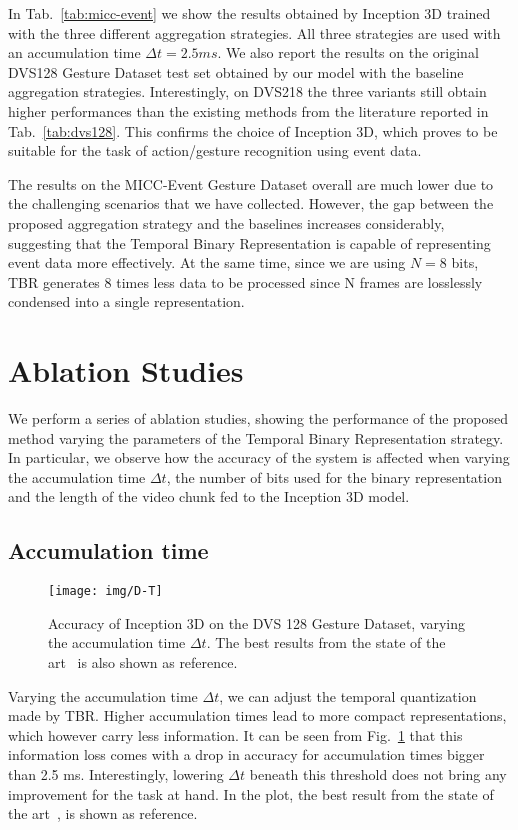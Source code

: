 \documentclass[a4paper,conference]{IEEEtran}
\begin{document}
In Tab.~\ref{tab:micc-event} we show the results obtained by Inception 3D trained with the three different aggregation strategies. All three strategies are used with an accumulation time $\Delta t=2.5 ms$. We also report the results on the original DVS128 Gesture Dataset test set obtained by our model with the baseline aggregation strategies. Interestingly, on DVS218 the three variants still obtain higher performances than the existing methods from the literature reported in Tab.~\ref{tab:dvs128}. This confirms the choice of Inception 3D, which proves to be suitable for the task of action/gesture recognition using event data.

The results on the MICC-Event Gesture Dataset overall are much lower due to the challenging scenarios that we have collected. However, the gap between the proposed aggregation strategy and the baselines increases considerably, suggesting that the Temporal Binary Representation is capable of representing event data more effectively. At the same time, since we are using $N=8$ bits, TBR generates 8 times less data to be processed since N frames are losslessly condensed into a single representation.

\section{Ablation Studies}
\label{sec:ablation}
We perform a series of ablation studies, showing the performance of the proposed method varying the parameters of the Temporal Binary Representation strategy.
In particular, we observe how the accuracy of the system is affected when varying the accumulation time $\Delta t$, the number of bits used for the binary representation and the length of the video chunk fed to the Inception 3D model.

\subsection{Accumulation time}
\begin{figure}[!t]
	\centering
	\texttt{[image: img/D-T]}
	\caption{Accuracy of Inception 3D on the DVS 128 Gesture Dataset, varying the accumulation time $\Delta t$. The best results from the state of the art~\cite{ghosh2019spatiotemporal} is also shown as reference.}
	\label{fig:deltat}
\end{figure}

Varying the accumulation time $\Delta t$, we can adjust the temporal quantization made by TBR. Higher accumulation times lead to more compact representations, which however carry less information. It can be seen from Fig.~\ref{fig:deltat} that this information loss comes with a drop in accuracy for accumulation times bigger than 2.5 ms. Interestingly, lowering $\Delta t$ beneath this threshold does not bring any improvement for the task at hand. In the plot, the best result from the state of the art~\cite{ghosh2019spatiotemporal}, is shown as reference.
\end{document}

